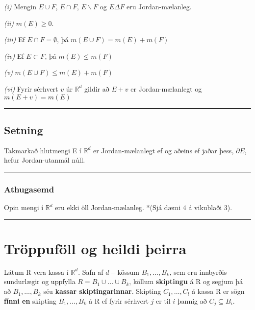 \documentclass[]{book}
\begin{document}
\emph{(i)} Mengin \(E\cup F\), \(E\cap F\), \(E\backslash F\) og \(E\Delta F\) eru Jordan-mælanleg.

\emph{(ii)} \(m(E) \geq 0\).

\emph{(iii)} Ef \(E\cap F = \emptyset\), þá \(m(E\cup F) = m(E) + m(F)\)

\emph{(iv)} Ef \(E \subset F\), þá \(m(E) \leq m(F)\)

\emph{(v)} \(m(E\cup F) \leq m(E) + m(F)\)

\emph{(vi)} Fyrir sérhvert \(v\) úr \(\mathbb R^d\) gildir að \(E + v\) er Jordan-mælanlegt og \(m(E + v) = m(E)\)

\begin{center}\rule{0.5\linewidth}{\linethickness}\end{center}

\hypertarget{setning-12}{%
\section{Setning}\label{setning-12}}

Takmarkað hlutmengi E í \(\mathbb R^d\) er Jordan-mælanlegt ef og aðeins ef jaðar þess, \(\partial E\), hefur Jordan-utanmál núll.

\begin{center}\rule{0.5\linewidth}{\linethickness}\end{center}

\hypertarget{athugasemd}{%
\subsection{Athugasemd}\label{athugasemd}}

Opin mengi í \(\mathbb R^d\) eru ekki öll Jordan-mælanleg. *(Sjá dæmi 4 á vikublaði 3).

\begin{center}\rule{0.5\linewidth}{\linethickness}\end{center}

\hypertarget{troppufoll-og-heildi-eirra}{%
\chapter{Tröppuföll og heildi þeirra}\label{troppufoll-og-heildi-eirra}}

Látum R vera kassa í \(\mathbb R^d\). Safn af \(d-\)kössum \(B_1, \dots, B_k\), sem eru innbyrðis sundurlægir og uppfylla \(R = B_1 \cup \dots \cup B_k\), köllum \textbf{skiptingu} á R og segjum þá að \(B_1, \dots, B_k\) séu \textbf{kassar skiptingarinnar}. Skipting \(C_1, \dots, C_l\) á kassa R er sögn \textbf{fínni en} skipting \(B_1, \dots, B_k\) á R ef fyrir sérhvert \(j\) er til \(i\) þannig að \(C_j \subseteq B_i\).
\end{document}
